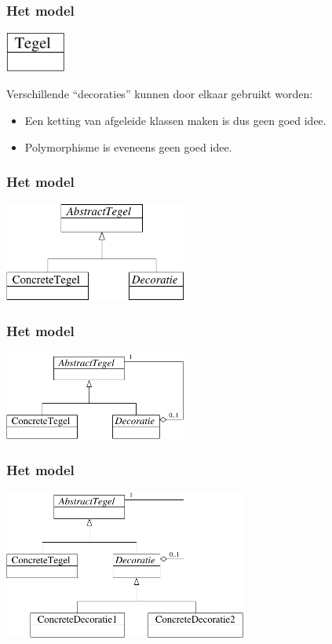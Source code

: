 \documentclass{beamer}
\begin{document}
\begin{frame}
\frametitle{Het model}
\begin{center}
\includegraphics[width=2cm]{model1}
\end{center}
Verschillende ``decoraties'' kunnen door elkaar gebruikt worden:
\begin{itemize}
\item Een ketting van afgeleide klassen maken is dus geen goed idee.
\item Polymorphisme is eveneens geen goed idee.
\end{itemize}
\end{frame}

\begin{frame}
\frametitle{Het model}
\begin{center}
\includegraphics[width=6cm]{model2}
\end{center}
\end{frame}

\begin{frame}
\frametitle{Het model}
\begin{center}
\includegraphics[width=6cm]{model3}
\end{center}
\end{frame}

\begin{frame}
\frametitle{Het model}
\begin{center}
\includegraphics[width=8cm]{model4}
\end{center}
\end{frame}
\end{document}
